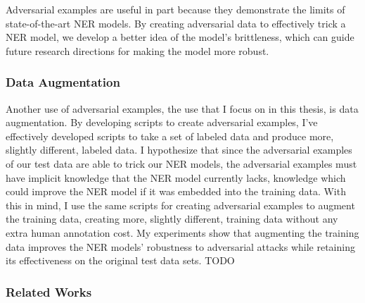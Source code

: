 Adversarial examples are useful in part because they demonstrate the limits of state-of-the-art NER models. By creating adversarial data to effectively trick a NER model, we develop a better idea of the model's brittleness, which can guide future research directions for making the model more robust.

\subsubsection{Data Augmentation}
Another use of adversarial examples, the use that I focus on in this thesis, is data augmentation. By developing scripts to create adversarial examples, I've effectively developed scripts to take a set of labeled data and produce more, slightly different, labeled data. I hypothesize that since the adversarial examples of our test data are able to trick our NER models, the adversarial examples must have implicit knowledge that the NER model currently lacks, knowledge which could improve the NER model if it was embedded into the training data. With this in mind, I use the same scripts for creating adversarial examples to augment the training data, creating more, slightly different, training data without any extra human annotation cost. My experiments show that augmenting the training data improves the NER models' robustness to adversarial attacks while retaining its effectiveness on the original test data sets. TODO


\subsubsection{Related Works}

